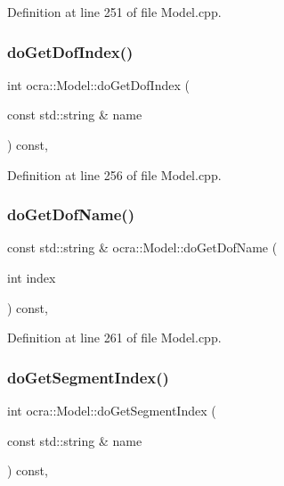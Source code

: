 Definition at line 251 of file Model.\+cpp.

\hypertarget{classocra_1_1Model_a0f4f5c643b386b3d29c6cb66ab38a5cd}{}\label{classocra_1_1Model_a0f4f5c643b386b3d29c6cb66ab38a5cd} 
\subsubsection{\texorpdfstring{do\+Get\+Dof\+Index()}{doGetDofIndex()}}
{\footnotesize\ttfamily int ocra\+::\+Model\+::do\+Get\+Dof\+Index (\begin{DoxyParamCaption}\item[{const std\+::string \&}]{name }\end{DoxyParamCaption}) const\hspace{0.3cm}{\ttfamily [protected]}, {\ttfamily [virtual]}}



Definition at line 256 of file Model.\+cpp.

\hypertarget{classocra_1_1Model_a81ea95179ef3cca4ad98c3c525eaaedf}{}\label{classocra_1_1Model_a81ea95179ef3cca4ad98c3c525eaaedf} 
\subsubsection{\texorpdfstring{do\+Get\+Dof\+Name()}{doGetDofName()}}
{\footnotesize\ttfamily const std\+::string \& ocra\+::\+Model\+::do\+Get\+Dof\+Name (\begin{DoxyParamCaption}\item[{int}]{index }\end{DoxyParamCaption}) const\hspace{0.3cm}{\ttfamily [protected]}, {\ttfamily [virtual]}}



Definition at line 261 of file Model.\+cpp.

\hypertarget{classocra_1_1Model_aede6166f1991c23db634aa5ff16b6584}{}\label{classocra_1_1Model_aede6166f1991c23db634aa5ff16b6584} 
\subsubsection{\texorpdfstring{do\+Get\+Segment\+Index()}{doGetSegmentIndex()}}
{\footnotesize\ttfamily int ocra\+::\+Model\+::do\+Get\+Segment\+Index (\begin{DoxyParamCaption}\item[{const std\+::string \&}]{name }\end{DoxyParamCaption}) const\hspace{0.3cm}{\ttfamily [protected]}, {}}



